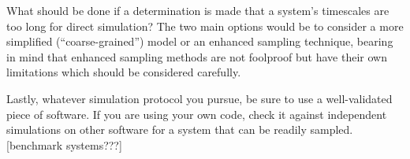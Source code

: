 What should be done if a determination is made that a system's timescales are too long for direct simulation?
The two main options would be to consider a more simplified (``coarse-grained'') model or an enhanced sampling technique, bearing in mind that enhanced sampling methods are not foolproof but have their own limitations which should be considered carefully.

Lastly, whatever simulation protocol you pursue, be sure to use a well-validated piece of software.
If you are using your own code, check it against independent simulations on other software for a system that can be readily sampled.
[benchmark systems???]

